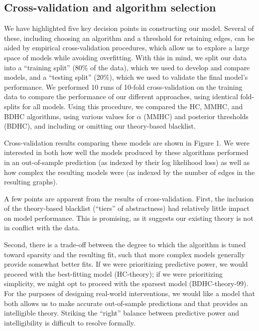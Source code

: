 \documentclass[10pt, letterpaper]{article}
\begin{document}
\subsection{Cross-validation and algorithm
selection}\label{cross-validation-and-algorithm-selection}

We have highlighted five key decision points in constructing our model.
Several of these, including choosing an algorithm and a threshold for
retaining edges, can be aided by empirical cross-validation procedures,
which allow us to explore a large space of models while avoiding
overfitting. With this in mind, we split our data into a ``training
split'' (80\% of the data), which we used to develop and compare models,
and a ``testing split'' (20\%), which we used to validate the final
model's performance. We performed 10 runs of 10-fold cross-validation on
the training data to compare the performance of our different
approaches, using identical fold-splits for all models. Using this
procedure, we compared the HC, MMHC, and BDHC algorithms, using various
values for \(\alpha\) (MMHC) and posterior thresholds (BDHC), and
including or omitting our theory-based blacklist.

Cross-validation results comparing these models are shown in Figure 1.
We were interested in both how well the models produced by these
algorithms performed in an out-of-sample prediction (as indexed by their
log likelihood loss) as well as how complex the resulting models were
(as indexed by the number of edges in the resulting graphs).

A few points are apparent from the results of cross-validation. First,
the inclusion of the theory-based blacklist (``tiers'' of abstractness)
had relatively little impact on model performance. This is promising, as
it suggests our existing theory is not in conflict with the data.

Second, there is a trade-off between the degree to which the algorithm
is tuned toward sparsity and the resulting fit, such that more complex
models generally provide somewhat better fits. If we were prioritizing
predictive power, we would proceed with the best-fitting model
(HC-theory); if we were prioritizing simplicity, we might opt to proceed
with the sparsest model (BDHC-theory-99). For the purposes of designing
real-world interventions, we would like a model that both allows us to
make accurate out-of-sample predictions and that provides an
intelligible theory. Striking the ``right'' balance between predictive
power and intelligibility is difficult to resolve formally.
\end{document}
